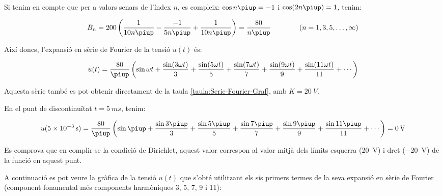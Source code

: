 \begin{exemple}
    Si tenim en compte que per a valors senars de l'índex $n$, es
    compleix: $\cos n \piup = -1$ i $\cos (2 n \piup) = 1$, tenim:

    \[
        B_n = 200 \left( \frac{1}{10 n \piup} - \frac{-1}{5 n \piup} +
        \frac{1}{10 n \piup} \right) = \frac{80}{n \piup}
        \qquad\qquad(n=1,3,5,\ldots,\infty)
    \]

    Així doncs, l'expansió en sèrie de Fourier de la tensió $u(t)$ és:

    \[
        u(t) = \frac{80}{\piup} \left( \sin \omega t + \frac{\sin (3 \omega t)}{3} +
        \frac{\sin (5 \omega t)}{5} + \frac{\sin (7 \omega t)}{7} +
        \frac{\sin (9 \omega t)}{9} + \frac{\sin (11 \omega t)}{11} +\cdots\right)
    \]

    Aquesta sèrie també es pot obtenir directament de la taula \vref{taula:Serie-Fourier-Graf}, amb $K=\SI{20}{V}$.

    En el punt de discontinuïtat $t=\SI{5}{ms}$, tenim:

    \[
        u(\SI{5e-3}{s}) =\frac{80}{\piup} \left( \sin \piup + \frac{\sin 3 \piup}{3} +
        \frac{\sin 5 \piup}{5} + \frac{\sin 7 \piup}{7} +
        \frac{\sin 9 \piup}{9} +\frac{\sin 11 \piup}{11}+\cdots\right) = \SI{0}{V}
    \]

    Es comprova que en complir-se la condició de Dirichlet, aquest valor
    correspon al valor mitjà dels límits esquerra (\SI{20}{V}) i dret (\SI{-20}{V})  de
    la funció en aquest punt.

    A continuació es pot veure la gràfica de la tensió $u(t)$ que
    s'obté utilitzant els sis primers termes de la seva expansió en sèrie de Fourier (component fonamental més components harmòniques 3, 5, 7, 9 i 11):

    \begin{center}
        
    \end{center}


\end{exemple}
